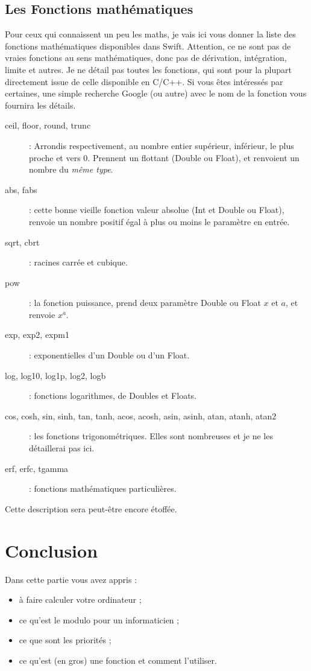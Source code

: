\subsection{Les Fonctions mathématiques}

Pour ceux qui connaissent un peu les maths, je vais ici vous donner la liste des fonctions mathématiques disponibles dans Swift. Attention, ce ne sont pas de vraies fonctions au sens mathématiques, donc pas de dérivation, intégration, limite et autres.
Je ne détail pas toutes les fonctions, qui sont pour la plupart directement issue de celle disponible en C/C++.
Si vous êtes intéressés par certaines, une simple recherche Google (ou autre) avec le nom de la fonction vous fournira les détails.
\begin{description}
\item[ceil, floor, round, trunc]
: Arrondis respectivement, au nombre entier supérieur, inférieur, le plus proche et vers 0. Prennent un flottant (Double ou Float), et renvoient un nombre du \emph{même type}.
\item[abs, fabs]
: cette bonne vieille fonction valeur absolue (Int et Double ou Float), renvoie un nombre positif égal à plus ou moins le paramètre en entrée.
\item[sqrt, cbrt]
: racines carrée et cubique.
\item[pow]
: la fonction puissance, prend deux paramètre Double ou Float $x$ et $a$, et renvoie $x^{a}$. %
\item[exp, exp2, expm1]
: exponentielles d'un Double ou d'un Float.
\item[log, log10, log1p, log2, logb]
: fonctions logarithmes, de Doubles et Floats.
\item[cos, cosh, sin, sinh, tan, tanh, acos, acosh, asin, asinh, atan, atanh, atan2]
: les fonctions trigonométriques. Elles sont nombreuses et je ne les détaillerai pas ici.
\item[erf, erfc, tgamma]
: fonctions mathématiques particulières.
\end{description}
Cette description sera peut-être encore étoffée.
\section*{Conclusion}
{}
Dans cette partie vous avez appris :
\begin{itemize}
\item à faire calculer votre ordinateur ;
\item ce qu'est le modulo pour un informaticien ;
\item ce que sont les priorités ;
\item ce qu'est (en gros) une fonction et comment l'utiliser.
\end{itemize}
